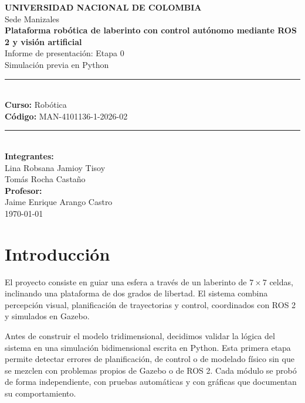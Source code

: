 \documentclass[11pt,a4paper]{article}
\begin{document}
\begin{titlepage}
    \centering
    \vspace*{2cm}

    {\Large \textbf{UNIVERSIDAD NACIONAL DE COLOMBIA}}\\[0.3cm]
    {\large Sede Manizales}\\[2cm]

    {\Huge \textbf{Plataforma robótica de laberinto con control autónomo mediante ROS 2 y visión artificial}}\\[0.5cm]
    {\Large Informe de presentación: Etapa 0}\\[0.3cm]
    {\large Simulación previa en Python}\\[2cm]

    \rule{\linewidth}{0.5mm}\\[0.4cm]
    {\large \textbf{Curso:} Robótica}\\
    {\large \textbf{Código:} MAN-4101136-1-2026-02}\\[0.4cm]
    \rule{\linewidth}{0.5mm}\\[1.5cm]

    {\Large \textbf{Integrantes:}}\\[0.4cm]
    {\large Lina Robsana Jamioy Tisoy}\\
    {\large Tomás Rocha Castaño}\\[2cm]

    {\large \textbf{Profesor:}}\\
    {\large Jaime Enrique Arango Castro}\\[2cm]

    \vfill
    {\large \today}

\end{titlepage}

\tableofcontents
\newpage

\section{Introducción}
El proyecto consiste en guiar una esfera a través de un laberinto de $7 \times 7$ celdas, inclinando una plataforma de dos grados de libertad. El sistema combina percepción visual, planificación de trayectorias y control, coordinados con ROS 2 y simulados en Gazebo.

Antes de construir el modelo tridimensional, decidimos validar la lógica del sistema en una simulación bidimensional escrita en Python. Esta primera etapa permite detectar errores de planificación, de control o de modelado físico sin que se mezclen con problemas propios de Gazebo o de ROS 2. Cada módulo se probó de forma independiente, con pruebas automáticas y con gráficas que documentan su comportamiento.
\end{document}
